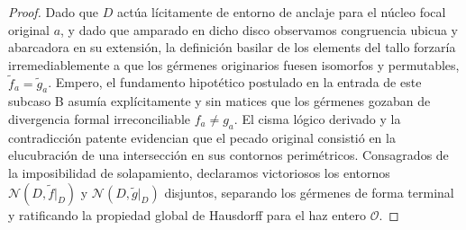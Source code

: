 \documentclass[11pt,a4paper]{article}
\theoremstyle{definition}
\theoremstyle{remark}
\numberwithin{equation}{section}
\begin{document}
\begin{proof}
Dado que $D$ actúa lícitamente de entorno de anclaje para el núcleo focal original $a$, y dado que amparado en dicho disco observamos congruencia ubicua y abarcadora en su extensión, la definición basilar de los elements del tallo forzaría irremediablemente a que los gérmenes originarios fuesen isomorfos y permutables, $\widetilde{f}_a = \widetilde{g}_a$. 
Empero, el fundamento hipotético postulado en la entrada de este subcaso B asumía explícitamente y sin matices que los gérmenes gozaban de divergencia formal irreconciliable $f_a \neq g_a$. El cisma lógico derivado y la contradicción patente evidencian que el pecado original consistió en la elucubración de una intersección en sus contornos perimétricos. Consagrados de la imposibilidad de solapamiento, declaramos victoriosos los entornos $\mathcal{N}(D, \widetilde{f}|_{D})$ y $\mathcal{N}(D, \widetilde{g}|_{D})$ disjuntos, separando los gérmenes de forma terminal y ratificando la propiedad global de Hausdorff para el haz entero $\mathcal{O}$.
\end{proof}
\end{document}
